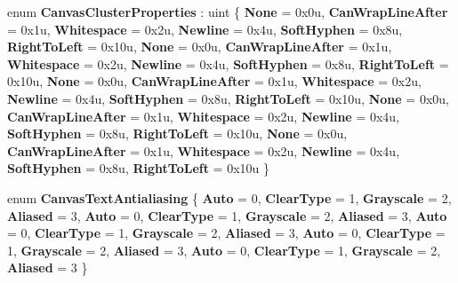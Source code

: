 \begin{DoxyCompactItemize}
enum {\bfseries Canvas\+Cluster\+Properties} \+: uint \{ \newline
{\bfseries None} = 0x0u, 
{\bfseries Can\+Wrap\+Line\+After} = 0x1u, 
{\bfseries Whitespace} = 0x2u, 
{\bfseries Newline} = 0x4u, 
\newline
{\bfseries Soft\+Hyphen} = 0x8u, 
{\bfseries Right\+To\+Left} = 0x10u, 
{\bfseries None} = 0x0u, 
{\bfseries Can\+Wrap\+Line\+After} = 0x1u, 
\newline
{\bfseries Whitespace} = 0x2u, 
{\bfseries Newline} = 0x4u, 
{\bfseries Soft\+Hyphen} = 0x8u, 
{\bfseries Right\+To\+Left} = 0x10u, 
\newline
{\bfseries None} = 0x0u, 
{\bfseries Can\+Wrap\+Line\+After} = 0x1u, 
{\bfseries Whitespace} = 0x2u, 
{\bfseries Newline} = 0x4u, 
\newline
{\bfseries Soft\+Hyphen} = 0x8u, 
{\bfseries Right\+To\+Left} = 0x10u, 
{\bfseries None} = 0x0u, 
{\bfseries Can\+Wrap\+Line\+After} = 0x1u, 
\newline
{\bfseries Whitespace} = 0x2u, 
{\bfseries Newline} = 0x4u, 
{\bfseries Soft\+Hyphen} = 0x8u, 
{\bfseries Right\+To\+Left} = 0x10u, 
\newline
{\bfseries None} = 0x0u, 
{\bfseries Can\+Wrap\+Line\+After} = 0x1u, 
{\bfseries Whitespace} = 0x2u, 
{\bfseries Newline} = 0x4u, 
\newline
{\bfseries Soft\+Hyphen} = 0x8u, 
{\bfseries Right\+To\+Left} = 0x10u
 \}
\item 
\mbox{\label{namespace_microsoft_1_1_graphics_1_1_canvas_1_1_text_ac5d7a4bab634cb1b3f6a231971b80974}} 
enum {\bfseries Canvas\+Text\+Antialiasing} \{ \newline
{\bfseries Auto} = 0, 
{\bfseries Clear\+Type} = 1, 
{\bfseries Grayscale} = 2, 
{\bfseries Aliased} = 3, 
\newline
{\bfseries Auto} = 0, 
{\bfseries Clear\+Type} = 1, 
{\bfseries Grayscale} = 2, 
{\bfseries Aliased} = 3, 
\newline
{\bfseries Auto} = 0, 
{\bfseries Clear\+Type} = 1, 
{\bfseries Grayscale} = 2, 
{\bfseries Aliased} = 3, 
\newline
{\bfseries Auto} = 0, 
{\bfseries Clear\+Type} = 1, 
{\bfseries Grayscale} = 2, 
{\bfseries Aliased} = 3, 
\newline
{\bfseries Auto} = 0, 
{\bfseries Clear\+Type} = 1, 
{\bfseries Grayscale} = 2, 
{\bfseries Aliased} = 3
 \}
\item 
\mbox{\label{namespace_microsoft_1_1_graphics_1_1_canvas_1_1_text_a79bca70c038ce3691b2e0c4ded541979}} 

\end{DoxyCompactItemize}
